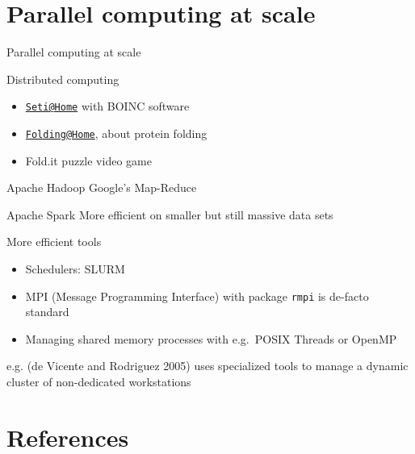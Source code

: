 \documentclass[
  ignorenonframetext,
  usenames,
  dvipsnames]{beamer}
\providecommand{\tightlist}{%
  \setlength{\itemsep}{0pt}\setlength{\parskip}{0pt}}
\begin{document}
\hypertarget{parallel-computing-at-scale}{%
\section{Parallel computing at
scale}\label{parallel-computing-at-scale}}

\begin{frame}[fragile]{Parallel computing at scale}
\footnotesize

\begin{block}{Distributed computing}
\protect\hypertarget{distributed-computing}{}
\begin{itemize}
\tightlist
\item
  \href{mailto:Seti@Home}{\nolinkurl{Seti@Home}} with BOINC software
\item
  \href{mailto:Folding@Home}{\nolinkurl{Folding@Home}}, about protein
  folding
\item
  Fold.it puzzle video game
\end{itemize}
\end{block}

\begin{block}{Apache Hadoop}
\protect\hypertarget{apache-hadoop}{}
Google's Map-Reduce
\end{block}

\begin{block}{Apache Spark}
\protect\hypertarget{apache-spark}{}
More efficient on smaller but still massive data sets
\end{block}

\begin{block}{More efficient tools}
\protect\hypertarget{more-efficient-tools}{}
\begin{itemize}
\tightlist
\item
  Schedulers: SLURM
\item
  MPI (Message Programming Interface) with package \texttt{rmpi} is
  de-facto standard
\item
  Managing shared memory processes with e.g.~POSIX Threads or OpenMP
\end{itemize}

e.g. (de Vicente and Rodriguez 2005) uses specialized tools to manage a
dynamic cluster of non-dedicated workstations \normalsize
\end{block}
\end{frame}

\hypertarget{references}{%
\section{References}\label{references}}
\end{document}
